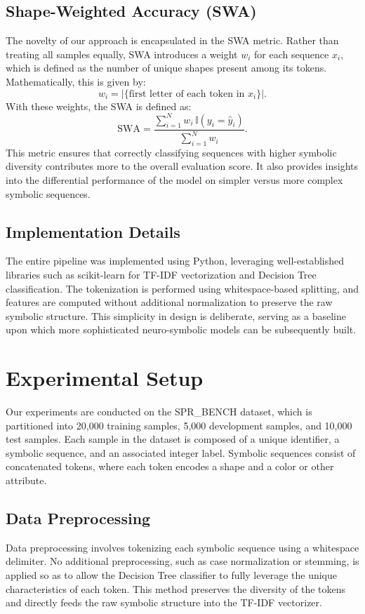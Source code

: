 \documentclass{article}
\begin{document}
\subsection{Shape-Weighted Accuracy (SWA)}
The novelty of our approach is encapsulated in the SWA metric. Rather than treating all samples equally, SWA introduces a weight \(w_i\) for each sequence \(x_i\), which is defined as the number of unique shapes present among its tokens. Mathematically, this is given by:
\[
w_i = \bigl|\{ \text{first letter of each token in } x_i \}\bigr|.
\]
With these weights, the SWA is defined as:
\[
\text{SWA} = \frac{\sum_{i=1}^{N} w_i\,\mathbb{I}(y_i = \hat{y}_i)}{\sum_{i=1}^{N} w_i}.
\]
This metric ensures that correctly classifying sequences with higher symbolic diversity contributes more to the overall evaluation score. It also provides insights into the differential performance of the model on simpler versus more complex symbolic sequences.

\subsection{Implementation Details}
The entire pipeline was implemented using Python, leveraging well-established libraries such as scikit-learn for TF-IDF vectorization and Decision Tree classification. The tokenization is performed using whitespace-based splitting, and features are computed without additional normalization to preserve the raw symbolic structure. This simplicity in design is deliberate, serving as a baseline upon which more sophisticated neuro-symbolic models can be subsequently built.

\section{Experimental Setup}
Our experiments are conducted on the SPR\_BENCH dataset, which is partitioned into 20,000 training samples, 5,000 development samples, and 10,000 test samples. Each sample in the dataset is composed of a unique identifier, a symbolic sequence, and an associated integer label. Symbolic sequences consist of concatenated tokens, where each token encodes a shape and a color or other attribute. 

\subsection{Data Preprocessing}
Data preprocessing involves tokenizing each symbolic sequence using a whitespace delimiter. No additional preprocessing, such as case normalization or stemming, is applied so as to allow the Decision Tree classifier to fully leverage the unique characteristics of each token. This method preserves the diversity of the tokens and directly feeds the raw symbolic structure into the TF-IDF vectorizer.
\end{document}
